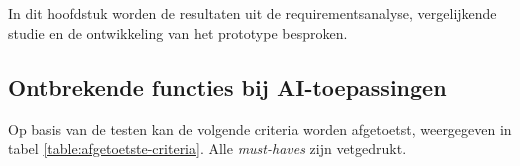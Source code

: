 \chapter{}%
\label{ch:resultaten}

In dit hoofdstuk worden de resultaten uit de requirementsanalyse, vergelijkende studie en de ontwikkeling van het prototype besproken. 

\section{Ontbrekende functies bij AI-toepassingen}


Op basis van de testen kan de volgende criteria worden afgetoetst, weergegeven in tabel \ref{table:afgetoetste-criteria}. Alle \textit{must-haves} zijn vetgedrukt.

